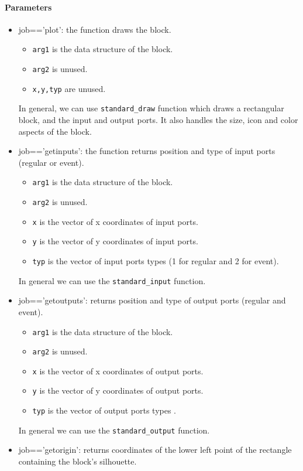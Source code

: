 \documentclass{book}
\begin{document}
\paragraph{Parameters}
\begin{itemize}
\item job=='plot': the function draws the block. 
  \begin{itemize}
  \item {\tt arg1} is the data structure of the block.
  \item {\tt arg2} is unused.
  \item {\tt x,y,typ} are unused.
  \end{itemize}
In general, we can use {\tt standard\_draw} \label{stdd} function
which  draws a rectangular block, and the input and output ports. It
also handles the size, icon and color aspects of the block.
\item job=='getinputs': the function returns position and type of
  input ports (regular or event). 
  \begin{itemize}
  \item  {\tt arg1} is the data structure of the block.
  \item  {\tt arg2} is unused.
  \item {\tt x} is the vector of x coordinates of input ports.
  \item {\tt y} is the vector of y coordinates of input ports.
  \item {\tt typ} is the vector of input ports types (1 for regular and 2 for event).
  \end{itemize}
  In general we can use the {\tt standard\_input} function.
\item job=='getoutputs': returns position and type of output ports
  (regular and event).
  \begin{itemize}
  \item  {\tt arg1} is the data structure of the block. 
  \item  {\tt arg2} is unused.
  \item {\tt x} is the vector of x coordinates of output ports.
  \item {\tt y} is the vector of y coordinates of output ports.
  \item {\tt typ} is the vector of output ports types .
  \end{itemize}
In general we can use the {\tt standard\_output} function.
\item job=='getorigin': returns coordinates of the lower
  left point of the rectangle containing the block's silhouette.

\end{itemize}
\end{document}
